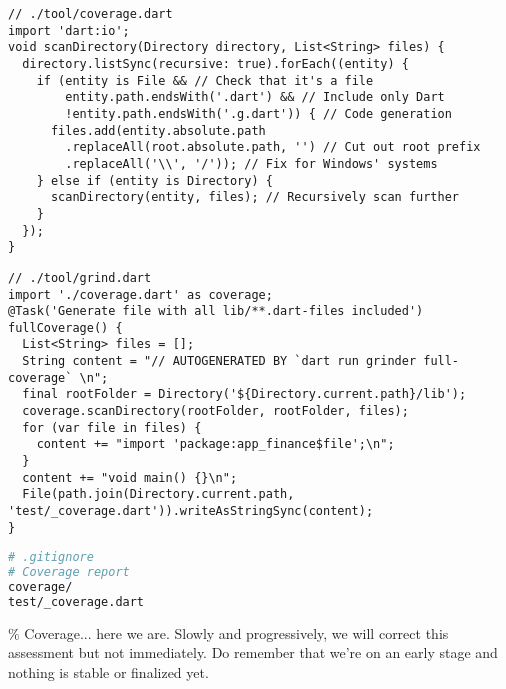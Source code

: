 \begin{lstlisting}
// ./tool/coverage.dart
import 'dart:io';
void scanDirectory(Directory directory, List<String> files) {
  directory.listSync(recursive: true).forEach((entity) {
    if (entity is File && // Check that it's a file
        entity.path.endsWith('.dart') && // Include only Dart
        !entity.path.endsWith('.g.dart')) { // Code generation
      files.add(entity.absolute.path
        .replaceAll(root.absolute.path, '') // Cut out root prefix
        .replaceAll('\\', '/')); // Fix for Windows' systems
    } else if (entity is Directory) {
      scanDirectory(entity, files); // Recursively scan further
    }
  });
}
\end{lstlisting}

\begin{lstlisting}
// ./tool/grind.dart
import './coverage.dart' as coverage;
@Task('Generate file with all lib/**.dart-files included')
fullCoverage() {
  List<String> files = [];
  String content = "// AUTOGENERATED BY `dart run grinder full-coverage` \n";
  final rootFolder = Directory('${Directory.current.path}/lib');
  coverage.scanDirectory(rootFolder, rootFolder, files);
  for (var file in files) {
    content += "import 'package:app_finance$file';\n";
  }
  content += "void main() {}\n";
  File(path.join(Directory.current.path, 'test/_coverage.dart')).writeAsStringSync(content);
}
\end{lstlisting}

\begin{lstlisting}[language=bash]
# .gitignore
# Coverage report
coverage/
test/_coverage.dart
\end{lstlisting}

\% Coverage... here we are. Slowly and progressively, we will correct this assessment but not immediately.
Do remember that we're on an early stage and nothing is stable or finalized yet.